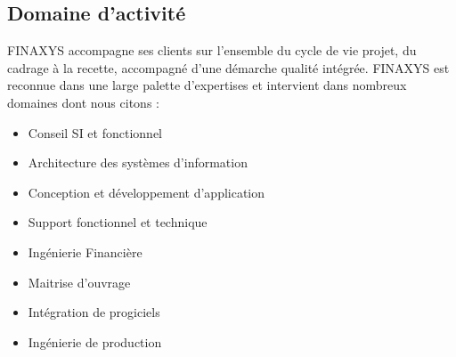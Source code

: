 \subsection{Domaine d'activité}
FINAXYS accompagne ses clients sur l’ensemble du cycle de vie projet, du cadrage à la recette, accompagné d’une démarche qualité intégrée. FINAXYS est reconnue dans une large palette d’expertises et intervient dans nombreux domaines dont nous citons :
\begin{itemize}  
    \item Conseil SI et fonctionnel
    \item Architecture des systèmes d’information
    \item Conception et développement d’application
    \item Support fonctionnel et technique
    \item Ingénierie Financière
    \item Maitrise d’ouvrage
    \item Intégration de progiciels
    \item Ingénierie de production
\end{itemize}

